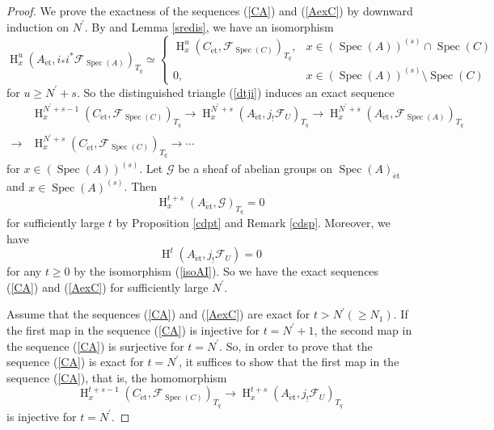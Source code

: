 \documentclass{article}
\newcommand{\spec}{\operatorname{Spec}}
\newcommand{\et}{\mathrm{\acute{e}t}}
\newcommand{\HO}{\operatorname{H}}
\begin{document}
%
\begin{proof}\upshape
We prove the exactness of the sequences (\ref{CA}) and (\ref{AexC}) by downward induction on $N^{\prime}$.
By \cite[Lemma 3.7]{Sak5} and Lemma \ref{sredis}, we have an isomorphism 
%
\begin{equation*}
\HO^{u}_{x}(
A_{\et},
i_{*}i^{*}
\mathcal{F}_{\spec(A)}
)_{T_{q}}
\simeq
\left\{
\begin{array}{ll}
\HO_{x}^{u}(C_{\et}, 
\mathcal{F}_{\spec(C)}
)_{T_{q}}, 
& x\in
(\spec(A))^{(s)}\cap \spec(C)
\\ [5pt]
0, 
& x\in
(\spec(A))^{(s)}\setminus \spec(C)
\end{array}
%
\right.
\end{equation*}
%
for $u\geq N^{\prime}+s$.
So the distinguished triangle (\ref{dtji}) induces
an exact sequence
%
\begin{align*}
&\HO^{N^{\prime}+s-1}_{x}(
C_{\et},
\mathcal{F}_{\spec(C)}
)_{T_{q}}
\to
\HO^{N^{\prime}+s}_{x}(
A_{\et},
j_{!}\mathcal{F}_{U}
)_{T_{q}}
\to
\HO^{N^{\prime}+s}_{x}(
A_{\et},
\mathcal{F}_{\spec(A)}
)_{T_{q}}
\\
\to
&\HO^{N^{\prime}+s}_{x}(
C_{\et},
\mathcal{F}_{\spec(C)}
)_{T_{q}}
\to\cdots
\end{align*}
%
for $x\in (\spec(A))^{(s)}$. 
Let $\mathcal{G}$ be a sheaf of abelian groups on 
$\spec(A)_{\et}$ and $x\in\spec(A)^{(s)}$.
Then
%
\begin{equation*}
\HO^{t+s}_{x}(A_{\et},
\mathcal{G})_{T_{q}}
=0
\end{equation*}
%
for sufficiently large $t$
by Proposition \ref{cdpt} and Remark \ref{cdsp}.
Moreover, we have
%
\begin{equation*}
\HO^{t}
(A_{\et}, j_{!}\mathcal{F}_{U})
=0
\end{equation*}
%
for any $t\geq 0$ by the isomorphism (\ref{isoAI}).
So we have the exact sequences (\ref{CA}) and
(\ref{AexC}) for sufficiently large $N^{\prime}$.

Assume that the sequences (\ref{CA}) and (\ref{AexC}) are exact for $t> N^{\prime} (\geq N_{1})$.
If the first map in the sequence (\ref{CA})
is injective for $t=N^{\prime}+1$,
the second map in the sequence (\ref{CA})
is surjective for $t=N^{\prime}$.
So, in order to prove that the sequence (\ref{CA}) is exact for $t=N^{\prime}$, 
it suffices to show that the first map in the sequence
(\ref{CA}), that is,
the homomorphism
%
\begin{equation}\label{ijinj}
\HO^{t+s-1}_{x}(C_{\et}, \mathcal{F}_{\spec(C)})_{T_{q}}
\to 
\HO^{t+s}_{x}(
A_{\et},
j_{!}\mathcal{F}_{U}
)_{T_{q}}
\end{equation}
%
is injective for $t=N^{\prime}$.


\end{proof}
\end{document}
